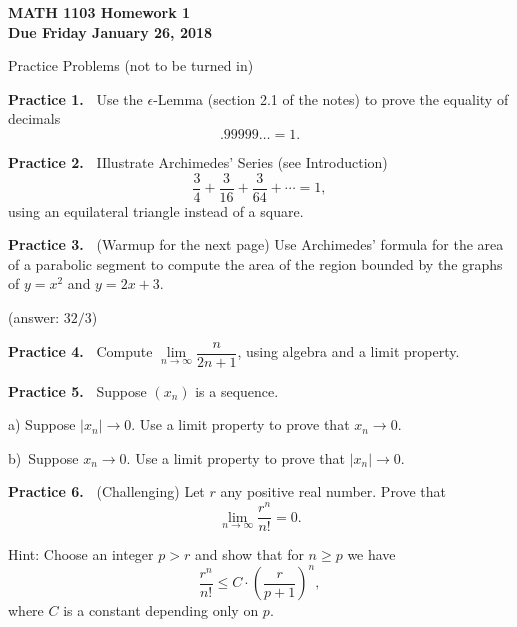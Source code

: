 \documentclass[12pt]{article}
\newcommand{\ep}{\epsilon}
\theoremstyle{definition}
\theoremstyle{remark}
\theoremstyle{definition}
\newenvironment{Solution}{\noindent\textbf{Solution.}}{}
\begin{document}
  

{\bf MATH 1103 Homework 1}\\
{\bf Due Friday January 26, 2018}


Practice Problems (not to be turned in)

\vskip5pt
{\bf Practice 1.\ } Use the $\ep$-Lemma (section 2.1 of the notes) to prove the equality of decimals
\[.99999\dots=1.\]

{\bf Practice 2.\ } IIlustrate Archimedes' Series (see Introduction) 
\[\frac{3}{4}+\frac{3}{16}+\frac{3}{64}+\cdots=1,\]
using an equilateral triangle instead of a square. 

{\bf Practice 3.\ } (Warmup for the next page) Use Archimedes' formula for the area of a parabolic segment to compute the area of the region bounded by the graphs of $y=x^2$ and $y=2x+3$. 

(answer: $32/3$)

{\bf Practice 4.\ } Compute $\lim\limits_{n\to\infty}\dfrac{n}{2n+1}$, using algebra and a limit property. 

{\bf Practice 5.\ } Suppose $(x_n)$ is a sequence. 

a) Suppose $|x_n|\to 0$. Use a limit property to prove that $x_n\to 0$.

b)\ Suppose $x_n\to 0$. Use a limit property to prove that $|x_n|\to 0$.


{\bf Practice 6.\ } (Challenging) Let $r$ any positive real number. 
Prove that 
\[\lim_{n\to\infty}\dfrac{r^n}{n!}=0.\] 

Hint: Choose an integer $p>r$ and show that for $n\geq p$ we have
\[\frac{r^n}{n!}\leq C\cdot \left(\frac{r}{p+1}\right)^n,\]
where $C$ is a constant depending only on $p$. 
\end{document}
